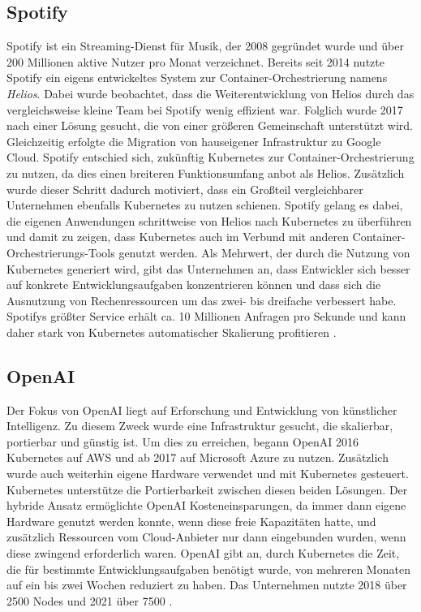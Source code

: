 \documentclass[11pt,a4paper]{article}
\begin{document}
\subsection{Spotify}
Spotify ist ein Streaming-Dienst für Musik, der 2008 gegründet wurde
und über 200 Millionen aktive Nutzer pro Monat verzeichnet.
Bereits seit 2014 nutzte Spotify ein eigens entwickeltes System zur Container-Orchestrierung
namens \emph{Helios}. Dabei wurde beobachtet, dass die Weiterentwicklung von Helios
durch das vergleichsweise kleine Team bei Spotify wenig effizient war.
Folglich wurde 2017 nach einer Lösung gesucht, die von einer größeren Gemeinschaft
unterstützt wird. Gleichzeitig erfolgte die Migration von hauseigener Infrastruktur
zu Google Cloud. Spotify entschied sich, zukünftig Kubernetes zur Container-Orchestrierung zu nutzen,
da dies einen breiteren Funktionsumfang anbot als Helios.
Zusätzlich wurde dieser Schritt dadurch motiviert, dass ein Großteil
vergleichbarer Unternehmen ebenfalls Kubernetes zu nutzen schienen.
Spotify gelang es dabei, die eigenen Anwendungen schrittweise
von Helios nach Kubernetes zu überführen und damit zu zeigen, dass Kubernetes
auch im Verbund mit anderen Container-Orchestrierungs-Tools genutzt werden.
Als Mehrwert, der durch die Nutzung von Kubernetes generiert wird,
gibt das Unternehmen an, dass Entwickler sich besser auf konkrete Entwicklungsaufgaben
konzentrieren können und dass sich die Ausnutzung von Rechenressourcen
um das zwei- bis dreifache verbessert habe.
Spotifys größter Service erhält ca. 10 Millionen Anfragen pro Sekunde
und kann daher stark von Kubernetes automatischer Skalierung profitieren \cite{story_spotify}.

\subsection{OpenAI}
\label{sec:openai}
Der Fokus von OpenAI liegt auf Erforschung und Entwicklung von künstlicher Intelligenz.
Zu diesem Zweck wurde eine Infrastruktur gesucht, die skalierbar, portierbar und günstig ist.
Um dies zu erreichen, begann OpenAI 2016 Kubernetes auf AWS und ab 2017 auf
Microsoft Azure zu nutzen. Zusätzlich wurde auch weiterhin eigene Hardware verwendet
und mit Kubernetes gesteuert.
Kubernetes unterstütze die Portierbarkeit zwischen diesen beiden Lösungen.
Der hybride Ansatz ermöglichte OpenAI Kosteneinsparungen,
da immer dann eigene Hardware genutzt werden konnte, wenn diese freie Kapazitäten hatte,
und zusätzlich Ressourcen vom Cloud-Anbieter nur dann eingebunden wurden,
wenn diese zwingend erforderlich waren.
OpenAI gibt an, durch Kubernetes die Zeit, die für bestimmte Entwicklungsaufgaben
benötigt wurde, von mehreren Monaten auf ein bis zwei Wochen reduziert zu haben.
Das Unternehmen nutzte 2018 über 2500 Nodes \cite{openai_scaling_2500} und 2021 über 7500 \cite{openai_scaling_7500} \cite{story_openai}.
\end{document}
